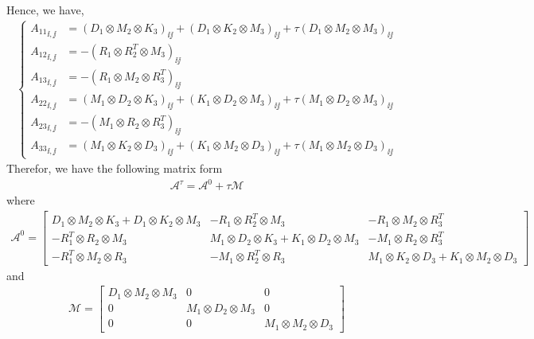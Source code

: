Hence, we have,
\begin{align*}
  \begin{cases}
    {A_{11}}_{\ii, \jj} &= \left( D_1 \otimes M_2 \otimes K_3 \right)_{\ii \jj} 
                         + \left( D_1 \otimes K_2 \otimes M_3 \right)_{\ii \jj} 
                         + \tau \left( D_1 \otimes M_2 \otimes M_3 \right)_{\ii \jj} 
    \\
    {A_{12}}_{\ii, \jj} &= - \left( R_1 \otimes R_2^T \otimes M_3 \right)_{\ii \jj} 
    \\
    {A_{13}}_{\ii, \jj} &= - \left( R_1 \otimes M_2 \otimes R_3^T \right)_{\ii \jj} 
    \\
    {A_{22}}_{\ii, \jj} & = \left( M_1 \otimes D_2 \otimes K_3 \right)_{\ii \jj} 
                         + \left( K_1 \otimes D_2 \otimes M_3 \right)_{\ii \jj} 
                         + \tau \left( M_1 \otimes D_2 \otimes M_3 \right)_{\ii \jj} 
    \\
    {A_{23}}_{\ii, \jj} &= - \left( M_1 \otimes R_2 \otimes R_3^T \right)_{\ii \jj} 
    \\
    {A_{33}}_{\ii, \jj} &= \left( M_1 \otimes K_2 \otimes D_3 \right)_{\ii \jj} 
                         + \left( K_1 \otimes M_2 \otimes D_3 \right)_{\ii \jj} 
                         + \tau \left( M_1 \otimes M_2 \otimes D_3 \right)_{\ii \jj} 
  \end{cases}
\end{align*}
Therefor, we have the following matrix form 
\begin{align}
  \mathcal{A}^\tau = \mathcal{A}^0 + \tau \mathcal{M}
\end{align}
where
\begin{align}
  \mathcal{A}^0 = 
  \begin{bmatrix}
    D_1 \otimes M_2 \otimes K_3 + D_1 \otimes K_2 \otimes M_3  &                          - R_1 \otimes R_2^T \otimes M_3   &  - R_1 \otimes M_2 \otimes R_3^T \\
                               - R_1^T \otimes R_2 \otimes M_3 & M_1 \otimes D_2 \otimes K_3 + K_1 \otimes D_2 \otimes M_3  &  - M_1 \otimes R_2 \otimes R_3^T \\
                               - R_1^T \otimes M_2 \otimes R_3 &                          - M_1 \otimes R_2^T \otimes R_3   & M_1 \otimes K_2 \otimes D_3 + K_1 \otimes M_2 \otimes D_3  
  \end{bmatrix}
  \label{eq:matrix-A0-3d}
\end{align}
and
\begin{align}
  \mathcal{M} = 
  \begin{bmatrix}
    D_1 \otimes M_2 \otimes M_3   & 0   &  0 \\
    0 & M_1 \otimes D_2 \otimes M_3   &  0 \\
    0 & 0 &  M_1 \otimes M_2 \otimes D_3 
  \end{bmatrix}
  \label{eq:matrix-M-3d}
\end{align}
